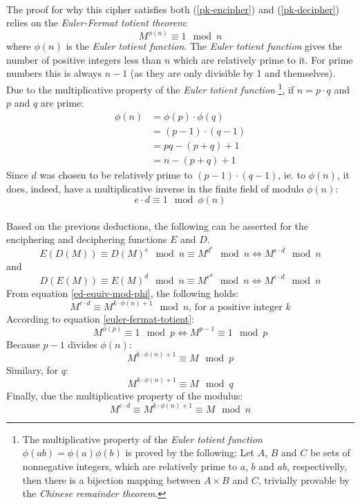 \documentclass[a4paper, 12pt]{article}
\begin{document}
\paragraph*{}
The proof for why this cipher satisfies both (\ref{pk-encipher}) and (\ref{pk-decipher}) relies on the 
\textit{Euler-Fermat totient theorem}:
\begin{equation} \label{euler-fermat-totient}
M^{\phi (n)} \equiv 1 \mod n
\end{equation}
where $\phi(n)$ is the \textit{Euler totient function}. The \textit{Euler totient function} gives the number of 
positive integers less than $n$ which are relatively prime to it. For prime numbers this is always $n-1$ (as they are 
only divisible by 1 and themselves). Due to the multiplicative property of the \textit{Euler totient function}
\footnote{The multiplicative property of the \textit{Euler totient function} $\phi(ab) = \phi(a)\phi(b)$ is proved by 
the following: Let $A$, $B$ and $C$ be sets of nonnegative integers, which are relatively prime to $a$, $b$ and $ab$, 
respectivelly, then there is a bijection mapping between $A \times B$ and $C$, trivially provable by the \textit{
Chinese remainder theorem}.}, if $n = p \cdot q$ and $p$ and $q$ are prime:
\begin{equation}
\begin{split}
\phi (n) & = \phi (p) \cdot \phi (q) \\
         & = (p - 1) \cdot (q - 1) \\
         & = pq - (p + q) + 1 \\
         & = n - (p + q) + 1
\end{split}
\end{equation}
Since $d$ was chosen to be relatively prime to $(p - 1) \cdot (q - 1)$, ie. to $\phi (n)$, it does, indeed, have a 
multiplicative inverse in the finite field of modulo $\phi (n)$:
\begin{equation} \label{ed-equiv-mod-phi}
e \cdot d \equiv 1 \mod \phi(n)
\end{equation}

\paragraph*{}
Based on the previous deductions, the following can be asserted for the enciphering and deciphering functions $E$ and 
$D$.
$$E(D(M)) \equiv D(M)^{e} \mod n \equiv M^{d^{e}} \mod n \Longleftrightarrow M^{e \cdot d} \mod n$$
and
$$D(E(M)) \equiv E(M)^{d} \mod n \equiv M^{e^{d}} \mod n \Longleftrightarrow M^{e \cdot d} \mod n$$
From equation \ref{ed-equiv-mod-phi}, the following holds:
$$M^{e \cdot d} \equiv M^{k \cdot \phi (n) + 1} \mod n\text{, for a positive integer $k$}$$
According to equation \ref{euler-fermat-totient}:
$$M^{\phi (p)} \equiv 1 \mod p \Longleftrightarrow M^{p - 1} \equiv 1 \mod p$$
Because $p - 1$ divides $\phi (n)$:
$$M^{k \cdot \phi (n) + 1} \equiv M \mod p$$
Similary, for $q$:
$$M^{k \cdot \phi (n) + 1} \equiv M \mod q$$
Finally, due the multiplicative property of the modulus:
$$M^{e \cdot d} \equiv M^{k \cdot \phi (n) + 1} \equiv M \mod n$$
\end{document}
